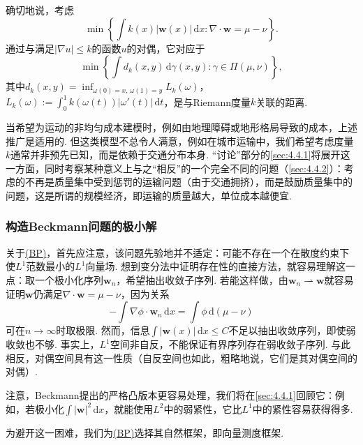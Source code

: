 确切地说，考虑
\[
 \min\left\{\int k(x)|\mathbf w(x)|\,\mathrm dx:
                               \nabla\cdot\mathbf w=\mu-\nu\right\}.
\]
\label{idx:root4-p129-weighted-distance}通过与满足$|\nabla u|\leq k$的函数$u$的对偶，它对应于
\[
 \min\left\{\int d_k(x,y)\,\mathrm d\gamma(x,y):
                                      \gamma\in\Pi(\mu,\nu)\right\},
\]
其中$d_k(x,y)=\inf_{\omega(0)=x,\,\omega(1)=y}L_k(\omega)$，$L_k(\omega):=\int_0^1k(\omega(t))|\omega'(t)|\,\mathrm dt$，是与Riemann度量$k$关联的距离.

当希望为运动的非均匀成本建模时，例如由地理障碍或地形格局导致的成本，上述推广是适用的. 但这类模型不总令人满意，例如在城市运输中，我们希望考虑度量$k$通常并非预先已知，而是依赖于交通分布本身. “讨论”部分的\autoref{sec:4.4.1}将展开这一方面，同时考察某种意义上与之“相反”的一个完全不同的问题（\autoref{sec:4.4.2}）：考虑的不再是质量集中受到惩罚的运输问题（由于交通拥挤），而是鼓励质量集中的问题，这是所谓的规模经济，即运输的质量越大，单位成本越便宜.

\subsubsection{构造Beckmann问题的极小解}\label{sec:4.2.2}

关于\hyperref[obj:4.5]{(BP)}，首先应注意，该问题先验地并不适定：可能不存在一个在散度约束下使$L^1$范数最小的$L^1$向量场. 想到变分法中证明存在性的直接方法，就容易理解这一点：取一个极小化序列$\mathbf w_n$，希望抽出收敛子序列. 若能这样做，由$\mathbf w_n\rightharpoonup\mathbf w$就容易证明$\mathbf w$仍满足$\nabla\cdot\mathbf w=\mu-\nu$，因为关系
\[
 -\int\nabla\phi\cdot\mathbf w_n\,\mathrm dx=\int\phi\,\mathrm d(\mu-\nu)
\]
可在$n\to\infty$时取极限. 然而，信息$\int|\mathbf w(x)|\,\mathrm dx\leq C$不足以抽出收敛序列，即使弱收敛也不够. 事实上，$L^1$空间非自反，不能保证有界序列存在弱收敛子序列. 与此相反，对偶空间具有这一性质（自反空间也如此，粗略地说，它们是其对偶空间的对偶）.

注意，Beckmann提出的严格凸版本更容易处理，我们将在\autoref{sec:4.4.1}回顾它：例如，若极小化$\int|\mathbf w|^2\,\mathrm dx$，就能使用$L^2$中的弱紧性，它比$L^1$中的紧性容易获得得多.

为避开这一困难，我们为\hyperref[obj:4.5]{(BP)}选择其自然框架，即向量测度框架.

